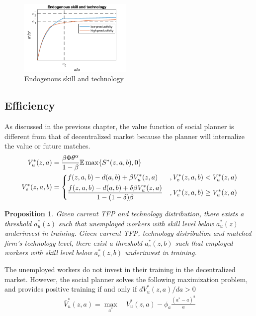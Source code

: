 \documentclass[12pt]{article}
\newtheorem{proposition}{Proposition}
\newcommand{\E}{\mathbb{E}}
\newcommand{\1}{\mathbb{1}}
\begin{document}
\begin{figure}[h!]
\centering
\includegraphics[width=0.48\textwidth]{Analytical5}
\caption{Endogenous skill and technology}
\label{Analytical5}
\end{figure}

\subsection{Efficiency}
As discussed in the previous chapter, the value function of social planner is different from that of decentralized market because the planner will internalize the value or future matches. 
\begin{align*}
V_u^*(z,a) &= \frac{\beta\Phi\theta^{\alpha}}{1-\beta}\E \max\{S^*(z,a,b),0\} \\
V_e^*(z,a,b) &= 
\begin{dcases}
f(z,a,b)-d(a,b)+\beta V_u^*(z,a)&, V_e^*(z,a,b)<V_u^*(z,a)\\
\frac{f(z,a,b)-d(a,b)+\delta\beta V_u^*(z,a)}{1-(1-\delta)\beta} &,  V_e^*(z,a,b) \geq V_u^*(z,a) \\
\end{dcases}
\end{align*}

\begin{proposition}
Given current TFP and technology distribution, there exists a threshold $a_u^{*}(z)$ such that unemployed workers with skill level below $a_u^{*}(z)$ underinvest in training. Given current TFP, technology distribution and matched firm's technology level, there exist a threshold $a_e^{*}(z,b)$ such that employed workers with skill level below $a_e^{*}(z,b)$ underinvest in training.
\end{proposition}

The unemployed workers do not invest in their training in the decentralized market. However, the social planner solves the following maximization problem, and provides positive training if and only if $d V_u^*(z,a)/d a>0$
\begin{align*}
\bar{V}_u^*(z,a) = \max_{a^*} \quad V_u^*(z,a)-\phi_a\frac{(a^*-a)^2}{a}
\end{align*}
\end{document}
